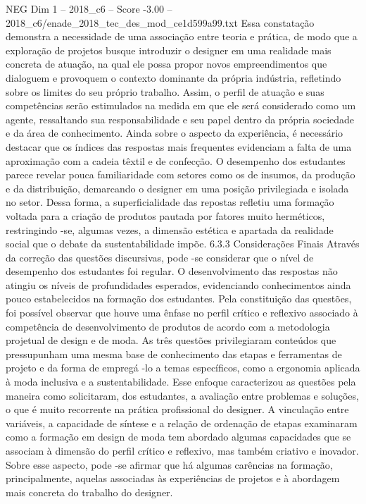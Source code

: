 \begin{textsample}{NEG Dim 1 – 2018\_c6 – Score -3.00 – 2018\_c6/enade\_2018\_tec\_des\_mod\_ce1d599a99.txt}
Essa constatação demonstra a necessidade de uma associação entre teoria e prática, de modo que a exploração de projetos busque introduzir o designer em uma realidade mais concreta de atuação, na qual ele possa propor novos empreendimentos que dialoguem e provoquem o contexto dominante da própria indústria, refletindo sobre os limites do seu próprio trabalho.
Assim, o perfil de atuação e suas competências serão estimulados na medida em que ele será considerado como um agente, ressaltando sua responsabilidade e seu papel dentro da própria sociedade e da área de conhecimento.
Ainda sobre o aspecto da experiência, é necessário destacar que os índices das respostas mais frequentes evidenciam a falta de uma aproximação com a cadeia têxtil e de confecção.
O desempenho dos estudantes parece revelar pouca familiaridade com setores como os de insumos, da produção e da distribuição, demarcando o designer em uma posição privilegiada e isolada no setor.
Dessa forma, a superficialidade das repostas refletiu uma formação voltada para a criação de produtos pautada por fatores muito herméticos, restringindo -se, algumas vezes, a dimensão estética e apartada da realidade social que o debate da sustentabilidade impõe. 6.3.3 Considerações Finais Através da correção das questões discursivas, pode -se considerar que o nível de desempenho dos estudantes foi regular.
O desenvolvimento das respostas não atingiu os níveis de profundidades esperados, evidenciando conhecimentos ainda pouco estabelecidos na formação dos estudantes.
Pela constituição das questões, foi possível observar que houve uma ênfase no perfil crítico e reflexivo associado à competência de desenvolvimento de produtos de acordo com a metodologia projetual de design e de moda.
As três questões privilegiaram conteúdos que pressupunham uma mesma base de conhecimento das etapas e ferramentas de projeto e da forma de empregá -lo a temas específicos, como a ergonomia aplicada à moda inclusiva e a sustentabilidade.
Esse enfoque caracterizou as questões pela maneira como solicitaram, dos estudantes, a avaliação entre problemas e soluções, o que é muito recorrente na prática profissional do designer.
A vinculação entre variáveis, a capacidade de síntese e a relação de ordenação de etapas examinaram como a formação em design de moda tem abordado algumas capacidades que se associam à dimensão do perfil crítico e reflexivo, mas também criativo e inovador.
Sobre esse aspecto, pode -se afirmar que há algumas carências na formação, principalmente, aquelas associadas às experiências de projetos e à abordagem mais concreta do trabalho do designer.

\end{textsample}
